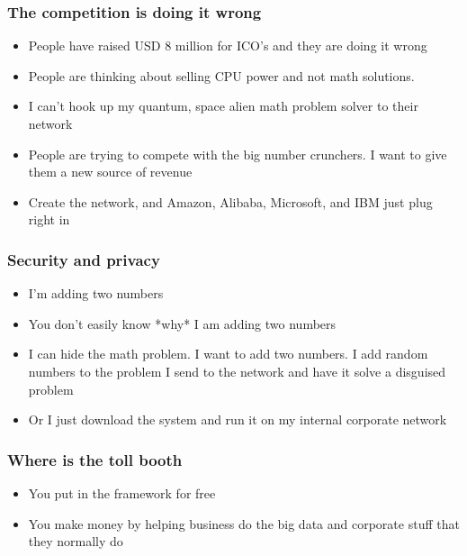\documentclass{beamer}
\begin{document}
\begin{frame}
  \frametitle{The competition is doing it wrong}
  \begin{itemize}
    \item People have raised USD 8 million for ICO's and they are
      doing it wrong
    \item People are thinking about selling CPU power and not
      math solutions.
    \item I can't hook up my quantum, space alien math problem solver
      to their network
    \item People are trying to compete with the big number crunchers.
      I want to give them a new source of revenue
    \item Create the network, and Amazon, Alibaba, Microsoft, and IBM
      just plug right in
  \end{itemize}
\end{frame}
\begin{frame}
  \frametitle{Security and privacy}
  \begin{itemize}
  \item I'm adding two numbers
  \item You don't easily know *why* I am adding two numbers
  \item I can hide the math problem.  I want to add two numbers.  I add
    random numbers to the problem I send to the network and have it
    solve a disguised problem
  \item Or I just download the system and run it on my internal
    corporate network
  \end{itemize}
\end{frame}
\begin{frame}
  \frametitle{Where is the toll booth}
  \begin{itemize}
  \item You put in the framework for free
  \item You make money by helping business do the big data and
      corporate stuff that they normally do
  \end{itemize}
\end{frame}
\end{document}
